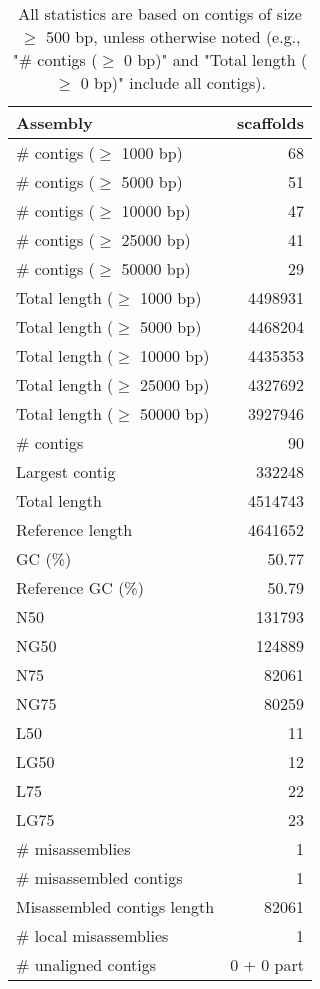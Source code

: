 \documentclass[12pt,a4paper]{article}
\begin{document}
\begin{table}[ht]
\begin{center}
\caption{All statistics are based on contigs of size $\geq$ 500 bp, unless otherwise noted (e.g., "\# contigs ($\geq$ 0 bp)" and "Total length ($\geq$ 0 bp)" include all contigs).}
\begin{tabular}{|l*{1}{|r}|}
\hline
Assembly & scaffolds \\ \hline
\# contigs ($\geq$ 1000 bp) & 68 \\ \hline
\# contigs ($\geq$ 5000 bp) & 51 \\ \hline
\# contigs ($\geq$ 10000 bp) & 47 \\ \hline
\# contigs ($\geq$ 25000 bp) & 41 \\ \hline
\# contigs ($\geq$ 50000 bp) & 29 \\ \hline
Total length ($\geq$ 1000 bp) & 4498931 \\ \hline
Total length ($\geq$ 5000 bp) & 4468204 \\ \hline
Total length ($\geq$ 10000 bp) & 4435353 \\ \hline
Total length ($\geq$ 25000 bp) & 4327692 \\ \hline
Total length ($\geq$ 50000 bp) & 3927946 \\ \hline
\# contigs & 90 \\ \hline
Largest contig & 332248 \\ \hline
Total length & 4514743 \\ \hline
Reference length & 4641652 \\ \hline
GC (\%) & 50.77 \\ \hline
Reference GC (\%) & 50.79 \\ \hline
N50 & 131793 \\ \hline
NG50 & 124889 \\ \hline
N75 & 82061 \\ \hline
NG75 & 80259 \\ \hline
L50 & 11 \\ \hline
LG50 & 12 \\ \hline
L75 & 22 \\ \hline
LG75 & 23 \\ \hline
\# misassemblies & 1 \\ \hline
\# misassembled contigs & 1 \\ \hline
Misassembled contigs length & 82061 \\ \hline
\# local misassemblies & 1 \\ \hline
\# unaligned contigs & 0 + 0 part \\ \hline

\end{tabular}
\end{center}
\end{table}
\end{document}
